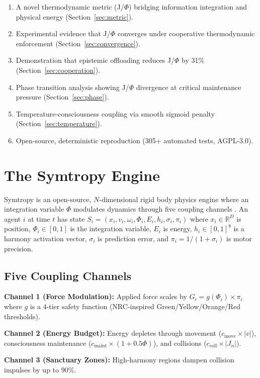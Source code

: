 \documentclass[entropy,article]{Definitions/mdpi}
\begin{document}
\begin{enumerate}
\item A novel thermodynamic metric (J/$\Phi$) bridging information integration and physical energy (Section~\ref{sec:metric}).
\item Experimental evidence that J/$\Phi$ converges under cooperative thermodynamic enforcement (Section~\ref{sec:convergence}).
\item Demonstration that epistemic offloading reduces J/$\Phi$ by 31\% (Section~\ref{sec:cooperation}).
\item Phase transition analysis showing J/$\Phi$ divergence at critical maintenance pressure (Section~\ref{sec:phase}).
\item Temperature-consciousness coupling via smooth sigmoid penalty (Section~\ref{sec:temperature}).
\item Open-source, deterministic reproduction (305+ automated tests, AGPL-3.0).
\end{enumerate}

\section{The Symtropy Engine}
\label{sec:engine}

Symtropy is an open-source, $N$-dimensional rigid body physics engine where an integration variable $\Phi$ modulates dynamics through five coupling channels \citep{stoltz2026alife}. An agent $i$ at time $t$ has state $S_i = (x_i, v_i, \omega_i, \Phi_i, E_i, h_i, \sigma_i, \pi_i)$ where $x_i \in \mathbb{R}^D$ is position, $\Phi_i \in [0,1]$ is the integration variable, $E_i$ is energy, $h_i \in [0,1]^8$ is a harmony activation vector, $\sigma_i$ is prediction error, and $\pi_i = 1/(1+\sigma_i)$ is motor precision.

\subsection{Five Coupling Channels}

\textbf{Channel 1 (Force Modulation):} Applied force scales by $G_i = g(\Phi_i) \times \pi_i$ where $g$ is a 4-tier safety function (NRC-inspired Green/Yellow/Orange/Red thresholds).

\textbf{Channel 2 (Energy Budget):} Energy depletes through movement ($c_{\text{move}} \times |v|$), consciousness maintenance ($c_{\text{maint}} \times (1 + 0.5\Phi)$), and collisions ($c_{\text{coll}} \times |J_n|$).

\textbf{Channel 3 (Sanctuary Zones):} High-harmony regions dampen collision impulses by up to 90\%.
\end{document}
